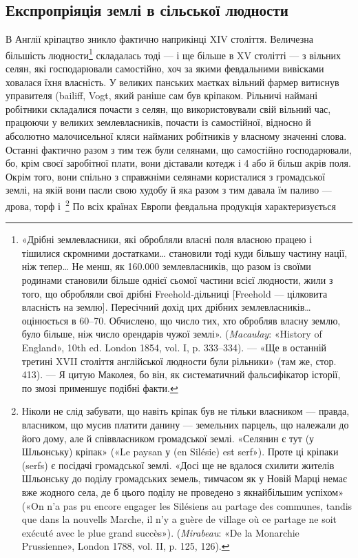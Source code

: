 \subsection{Експропріяція землі в сільської людности}

В Англії кріпацтво зникло фактично наприкінці XIV століття.
Величезна більшість людности\footnote{
«Дрібні землевласники, які обробляли власні поля власною працею
і тішилися скромними достатками\dots{} становили тоді куди більшу
частину нації, ніж тепер\dots{} Не менш, як \num{160.000} землевласників, що разом
із своїми родинами становили більше однієї сьомої частини всієї людности,
жили з того, що обробляли свої дрібні Freehold-дільниці [Freehold —
цілковита власність на землю]. Пересічний дохід цих дрібних землевласників\dots{}
оцінюється в 60--70. Обчислено, що число
тих, хто обробляв власну землю, було більше, ніж число орендарів чужої
землі». (\emph{Macaulay}: «History of England», 10th ed. London 1854,
vol. I, p. 333--334). — «Ще в останній третині XVII століття 
англійської людности були рільники» (там же, стор. 413). — Я цитую Маколея,
бо він, як систематичний фальсифікатор історії, по змозі применшує
подібні факти.
} складалась тоді — і ще
більше в XV столітті — з вільних селян, які господарювали
самостійно, хоч за якими февдальними вивісками ховалася їхня
власність. У великих панських маєтках вільний фармер витиснув
управителя (bailiff, Vogt, який раніше сам був кріпаком. Рільничі
наймані робітники складалися почасти з селян, що використовували
свій вільний час, працюючи у великих землевласників,
почасти із самостійної, відносно й абсолютно малочисельної
кляси найманих робітників у власному значенні слова. Останні
фактично разом з тим теж були селянами, що самостійно господарювали,
бо, крім своєї заробітної плати, вони діставали котедж
і 4 або й більш акрів поля. Окрім того, вони спільно з справжніми
селянами користалися з громадської землі, на якій вони пасли
свою худобу й яка разом з тим давала їм паливо — дрова, торф
і~\footnote{
Ніколи не слід забувати, що навіть кріпак був не тільки власником
— правда, власником, що мусив платити данину — земельних
парцель, що належали до його дому, але й співвласником громадської
землі. «Селянин є тут (у Шльонську) кріпак» («Le paysan у (en Silésie)
est serf»). Проте ці кріпаки (serfs) є посідачі громадської землі. «Досі
ще не вдалося схилити жителів Шльонську до поділу громадських
земель, тимчасом як у Новій Марці немає вже жодного села, де б цього
поділу не проведено з якнайбільшим успіхом» («On n’a pas pu encore
engager les Silésiens au partage des communes, tandis que dans la nouvells
Marche, il n’y a guère de village où ce partage ne soit exécuté avec le plue
grand succès»). (\emph{Mirabeau}: «De la Monarchie Prussienne», London 1788,
vol. II, p. 125, 126).
} По всіх країнах Европи февдальна продукція характеризується
